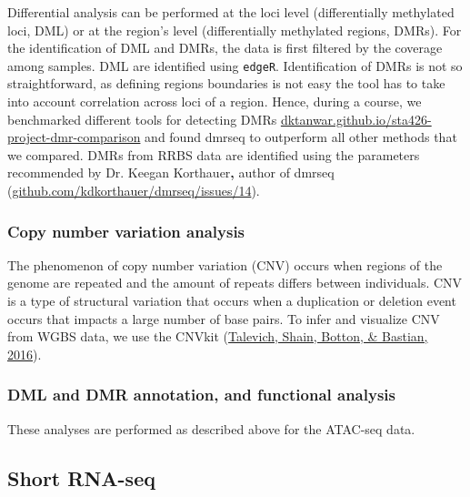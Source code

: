 \documentclass[12pt,twoside]{reedthesis}
\begin{document}
Differential analysis can be performed at the loci level (differentially
methylated loci, DML) or at the region's level (differentially
methylated regions, DMRs). For the identification of DML and DMRs, the
data is first filtered by the coverage among samples. DML are identified
using \texttt{edgeR}. Identification of DMRs is not so straightforward, as
defining regions boundaries is not easy the tool has to take into
account correlation across loci of a region. Hence, during a course, we
benchmarked different tools for detecting DMRs
\href{https://dktanwar.github.io/sta426-project-dmr-comparison/report/project_report.html}{dktanwar.github.io/sta426-project-dmr-comparison}
and found dmrseq to outperform all other methods that we compared. DMRs
from RRBS data are identified using the parameters recommended by Dr.
Keegan Korthauer\textbf{,} author of dmrseq
(\href{https://github.com/kdkorthauer/dmrseq/issues/14}{github.com/kdkorthauer/dmrseq/issues/14}).

\hypertarget{m3.5.3}{%
\subsubsection*{Copy number variation analysis}\label{m3.5.3}}

The phenomenon of copy number variation (CNV) occurs when regions of the
genome are repeated and the amount of repeats differs between
individuals. CNV is a type of structural variation that occurs when a
duplication or deletion event occurs that impacts a large number of base
pairs. To infer and visualize CNV from WGBS data, we use the CNVkit
(\protect\hyperlink{ref-talevich2016}{Talevich, Shain, Botton, \& Bastian, 2016}).

\hypertarget{m3.5.4}{%
\subsubsection*{DML and DMR annotation, and functional analysis}\label{m3.5.4}}

These analyses are performed as described above for the ATAC-seq data.

\hypertarget{m3.6}{%
\subsection*{Short RNA-seq}\label{m3.6}}
\end{document}
